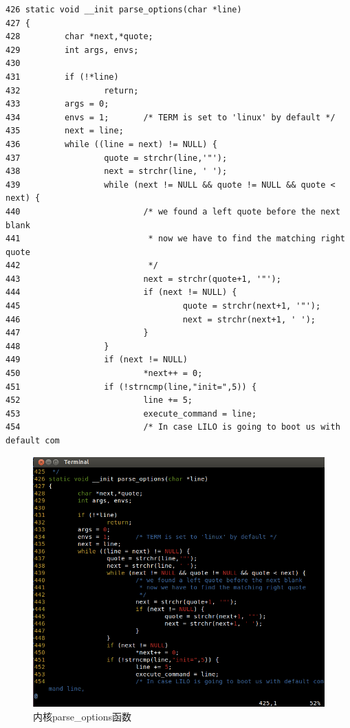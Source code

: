 {\begin{shaded}\begin{verbatim}
426 static void __init parse_options(char *line)
427 {
428         char *next,*quote;
429         int args, envs;
430 
431         if (!*line)
432                 return;
433         args = 0;
434         envs = 1;       /* TERM is set to 'linux' by default */
435         next = line;
436         while ((line = next) != NULL) {
437                 quote = strchr(line,'"');
438                 next = strchr(line, ' ');
439                 while (next != NULL && quote != NULL && quote < next) {
440                         /* we found a left quote before the next blank
441                          * now we have to find the matching right quote
442                          */
443                         next = strchr(quote+1, '"');
444                         if (next != NULL) {
445                                 quote = strchr(next+1, '"');
446                                 next = strchr(next+1, ' ');
447                         }
448                 }
449                 if (next != NULL)
450                         *next++ = 0;
451                 if (!strncmp(line,"init=",5)) {
452                         line += 5;
453                         execute_command = line;
454                         /* In case LILO is going to boot us with default com      
\end{verbatim}\end{shaded}}
\begin{figure}[htbp]
\centering
\includegraphics{./pictures/parse_options.png}
\caption{内核parse\_options函数}
\end{figure}

